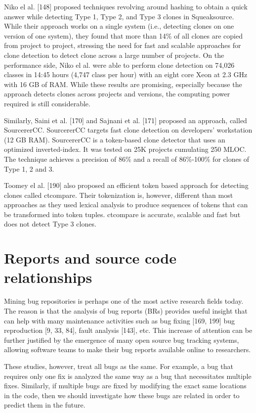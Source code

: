\documentclass[12pt]{report}
\begin{document}
Niko el al. {[}148{]} proposed techniques revolving around hashing to
obtain a quick answer while detecting Type 1, Type 2, and Type 3 clones
in Squeaksource. While their approach works on a single system (i.e.,
detecting clones on one version of one system), they found that more
than 14\% of all clones are copied from project to project, stressing
the need for fast and scalable approaches for clone detection to detect
clone across a large number of projects. On the performance side, Niko
el al. were able to perform clone detection on 74,026 classes in 14:45
hours (4,747 class per hour) with an eight core Xeon at 2.3 GHz with 16
GB of RAM. While these results are promising, especially because the
approach detects clones across projects and versions, the computing
power required is still considerable.

Similarly, Saini et al. {[}170{]} and Sajnani et al. {[}171{]} proposed
an approach, called SourcererCC. SourcererCC targets fast clone
detection on developers' workstation (12 GB RAM). SourcererCC is a
token-based clone detector that uses an optimized inverted-index. It was
tested on 25K projects cumulating 250 MLOC. The technique achieves a
precision of 86\% and a recall of 86\%-100\% for clones of Type 1, 2 and
3.

Toomey el al. {[}190{]} also proposed an efficient token based approach
for detecting clones called ctcompare. Their tokenization is, however,
different than most approaches as they used lexical analysis to produce
sequences of tokens that can be transformed into token tuples. ctcompare
is accurate, scalable and fast but does not detect Type 3 clones.

\section{Reports and source code
relationships}\label{reports-and-source-code-relationships}

Mining bug repositories is perhaps one of the most active research
fields today. The reason is that the analysis of bug reports (BRs)
provides useful insight that can help with many maintenance activities
such as bug fixing {[}169, 199{]} bug reproduction {[}9, 33, 84{]},
fault analysis {[}143{]}, etc. This increase of attention can be further
justified by the emergence of many open source bug tracking systems,
allowing software teams to make their bug reports available online to
researchers.

These studies, however, treat all bugs as the same. For example, a bug
that requires only one fix is analyzed the same way as a bug that
necessitates multiple fixes. Similarly, if multiple bugs are fixed by
modifying the exact same locations in the code, then we should
investigate how these bugs are related in order to predict them in the
future.
\end{document}

